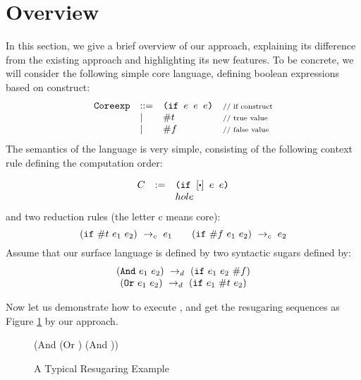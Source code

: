 \section{Overview}
\label{sec2}


In this section, we give a brief overview of our approach, explaining its difference from the existing  approach and highlighting its new features. To be concrete, we will consider the following simple core language, defining boolean expressions based on  construct:
\[
\begin{array}{lllll}
\mbox{\tt Coreexp} &::=& \texttt{(if~$e$~$e$~$e$)} &\mbox{{\scriptsize // if construct}}\\
& |& \#t  & \mbox{{\scriptsize // true value}}\\
& |& \#f & \mbox{{\scriptsize // false value}}
\end{array}
\]
The semantics of the language is very simple, consisting of the following context rule defining the computation order:

\[
\begin{array}{lcl}
C &:=& \Code{(if $[\bigcdot]$ $e$ $e$)}\\
&&hole\\
\end{array}
\]
and two reduction rules (the letter c means core):
\[
\centering
 \redc{(\m{if}~\true~e_1~e_2)}{e_1}  \qquad \redc{(\m{if}~\false~e_1~e_2)}{e_2} 
\]
Assume that our surface language is defined by two syntactic sugars defined by:
\[
\begin{array}{c}
(\mbox{\tt And}~e_1~e_2) ~\rightarrow_d~ (\mbox{\tt if}~e_1~e_2~\#f)\\
(\mbox{\tt Or}~e_1~e_2) ~\rightarrow_d~ (\mbox{\tt if}~e_1~\#t~e_2)
\end{array}
\]


Now let us demonstrate how to execute , and get the resugaring sequences as Figure \ref{fig:standard} by our approach.

\begin{figure}[thb]
\begin{center}
\begin{minipage}{6cm}
\begin{footnotesize}
\begin{Codes}
    (And (Or \true \false) (And \false \true))
\end{Codes}
\end{footnotesize}
\end{minipage}
\end{center}
\caption{A Typical Resugaring Example}
\label{fig:standard}
\end{figure}



